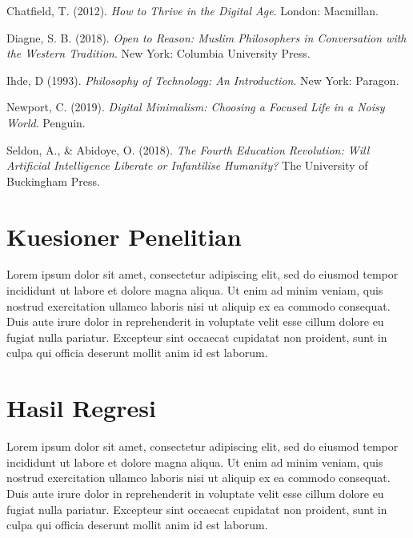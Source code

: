 \documentclass[12pt,hidelinks]{report}
\begin{document}
\begin{thebibliography}{99}
 Chatfield, T. (2012). \textit{How to Thrive in the Digital Age}. London: Macmillan.


 Diagne, S. B. (2018). \textit{Open to Reason: Muslim Philosophers in Conversation with the Western Tradition}. New York: Columbia University Press.

 Ihde, D (1993). \textit{Philosophy of Technology: An Introduction}. New York: Paragon.

 Newport, C. (2019). \textit{Digital Minimalism: Choosing a Focused Life in a Noisy World}. Penguin.

 Seldon, A., \& Abidoye, O. (2018). \textit{The Fourth Education Revolution: Will Artificial Intelligence Liberate or Infantilise Humanity?} The University of Buckingham Press.

\end{thebibliography}


\appendix
\chapter{Kuesioner Penelitian}
    Lorem ipsum dolor sit amet, consectetur adipiscing elit, sed do eiusmod tempor incididunt ut labore et dolore magna aliqua. Ut enim ad minim veniam, quis nostrud exercitation ullamco laboris nisi ut aliquip ex ea commodo consequat. Duis aute irure dolor in reprehenderit in voluptate velit esse cillum dolore eu fugiat nulla pariatur. Excepteur sint occaecat cupidatat non proident, sunt in culpa qui officia deserunt mollit anim id est laborum.

\chapter{Hasil Regresi}
    Lorem ipsum dolor sit amet, consectetur adipiscing elit, sed do eiusmod tempor incididunt ut labore et dolore magna aliqua. Ut enim ad minim veniam, quis nostrud exercitation ullamco laboris nisi ut aliquip ex ea commodo consequat. Duis aute irure dolor in reprehenderit in voluptate velit esse cillum dolore eu fugiat nulla pariatur. Excepteur sint occaecat cupidatat non proident, sunt in culpa qui officia deserunt mollit anim id est laborum.
\end{document}
